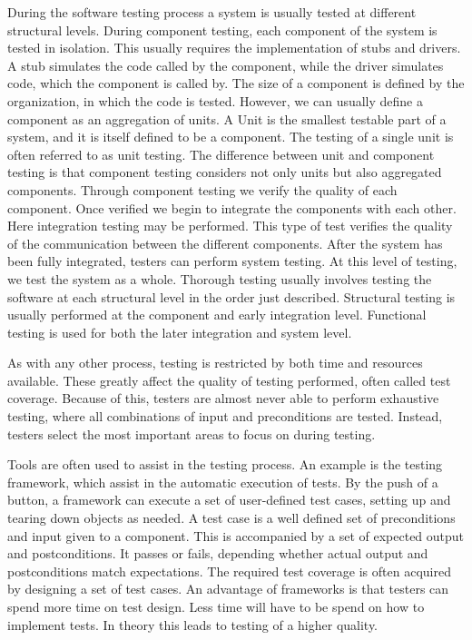 During the software testing process a system is usually tested at different structural levels. During component testing, each component of the system is tested in isolation. This usually requires the implementation of stubs and drivers. A stub simulates the code called by the component, while the driver simulates code, which the component is called by. The size of a component is defined by the organization, in which the code is tested. However, we can usually define a component as an aggregation of units. A Unit is the smallest testable part of a system, and it is itself defined to be a component. The testing of a single unit is often referred to as unit testing. The difference between unit and component testing is that component testing considers not only units but also aggregated components. Through component testing we verify the quality of each component. Once verified we begin to integrate the components with each other. Here integration testing may be performed. This type of test verifies the quality of the communication between the different components. After the system has been fully integrated, testers can perform system testing. At this level of testing, we test the system as a whole. Thorough testing usually involves testing the software at each structural level in the order just described. Structural testing is usually performed at the component and early integration level. Functional testing is used for both the later integration and system level.

As with any other process, testing is restricted by both time and resources available. These greatly affect the quality of testing performed, often called test coverage. Because of this, testers are almost never able to perform exhaustive testing, where all combinations of input and preconditions are tested. Instead, testers select the most important areas to focus on during testing.

Tools are often used to assist in the testing process. An example is the testing framework, which assist in the automatic execution of tests. By the push of a button, a framework can execute a set of user-defined test cases, setting up and tearing down objects as needed. A test case is a well defined set of preconditions and input given to a component. This is accompanied by a set of expected output and postconditions. It passes or fails, depending whether actual output and postconditions match expectations. The required test coverage is often acquired by designing a set of test cases. An advantage of frameworks is that testers can spend more time on test design. Less time will have to be spend on how to implement tests. In theory this leads to testing of a higher quality.

